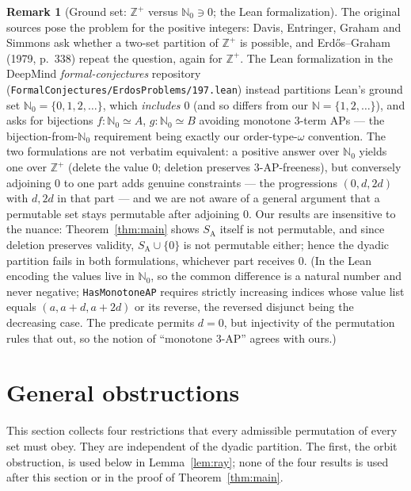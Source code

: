 \documentclass[11pt]{article}
\theoremstyle{definition}
\newtheorem{remark}[theorem]{Remark}
\newcommand{\Z}{\mathbb{Z}}
\newcommand{\N}{\mathbb{N}}
\newcommand{\SA}{S_{\mathrm{A}}}
\begin{document}
\begin{remark}[Ground set: $\Z^+$ versus $\N_0 \ni 0$; the Lean formalization]
\label{rem:lean}
The original sources pose the problem for the positive integers: Davis,
Entringer, Graham and Simmons ask whether a two-set partition of $\Z^+$ is
possible, and Erd\H{o}s--Graham (1979, p.~338) repeat the question, again
for $\Z^+$. The Lean formalization in the DeepMind
\emph{formal-conjectures} repository
(\texttt{FormalConjectures/ErdosProblems/197.lean}) instead partitions
Lean's ground set $\N_0 = \{0, 1, 2, \dots\}$, which \emph{includes $0$}
(and so differs from our $\N = \{1,2,\dots\}$), and asks for
bijections $f\colon \N_0 \simeq A$, $g\colon \N_0 \simeq B$ avoiding monotone
$3$-term APs --- the bijection-from-$\N_0$ requirement being exactly our
order-type-$\omega$ convention. The two formulations are not verbatim
equivalent: a positive answer over $\N_0$ yields one over $\Z^+$ (delete the
value $0$; deletion preserves $3$-AP-freeness), but conversely adjoining
$0$ to one part adds genuine constraints --- the progressions $(0, d, 2d)$
with $d, 2d$ in that part --- and we are not aware of a general argument
that a permutable set stays permutable after adjoining $0$. Our results
are insensitive to the nuance: Theorem~\ref{thm:main} shows $\SA$ itself
is not permutable, and since deletion preserves validity, $\SA \cup \{0\}$
is not permutable either; hence the dyadic partition fails in both
formulations, whichever part receives $0$. (In the Lean encoding the
values live in $\N_0$, so the common difference is a natural number and never
negative; \texttt{HasMonotoneAP} requires strictly increasing indices whose
value list equals $(a, a+d, a+2d)$ or its reverse, the reversed disjunct
being the decreasing case. The predicate permits $d = 0$, but injectivity
of the permutation rules that out, so the notion of ``monotone $3$-AP''
agrees with ours.)
\end{remark}

\section{General obstructions}\label{sec:general}

This section collects four restrictions that every admissible permutation
of every set must obey. They are independent of the dyadic partition.
The first, the orbit obstruction, is used below in Lemma~\ref{lem:ray};
none of the four results is used after this section or in the proof of
Theorem~\ref{thm:main}.
\end{document}
